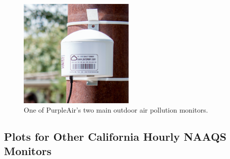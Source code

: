 \documentclass[12pt]{article}
\begin{document}
\begin{figure}[h!]
\centering
\includegraphics[width=0.5\textwidth]{appendix/sensor_pics/PA_outdoor_monitor.png}
\caption{One of PurpleAir's two main outdoor air pollution monitors.}
\label{fig:pic-ps-sensor}
\end{figure}

\FloatBarrier
\newpage
\subsection{Plots for Other California Hourly NAAQS Monitors} \label{app-additional-plots}




\end{document}
